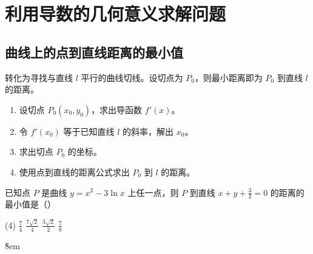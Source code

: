 \section{利用导数的几何意义求解问题}

\subsection{曲线上的点到直线距离的最小值}
\begin{theorem}[曲线到直线距离的最小值]
    转化为寻找与直线 $l$ 平行的曲线切线。设切点为 $P_0$，则最小距离即为 $P_0$ 到直线 $l$ 的距离。
    \begin{enumerate}
        \item 设切点 $P_0(x_0, y_0)$，求出导函数 $f'(x)$。
        \item 令 $f'(x_0)$ 等于已知直线 $l$ 的斜率，解出 $x_0$。
        \item 求出切点 $P_0$ 的坐标。
        \item 使用点到直线的距离公式求出 $P_0$ 到 $l$ 的距离。
    \end{enumerate}
\end{theorem}
\begin{example}
    已知点 $P$ 是曲线 $y = x^{2} - 3\ln x$ 上任一点，则 $P$ 到直线 $x + y + \frac{3}{2} = 0$ 的距离的最小值是（\quad）
    \begin{tasks}(4)
        \task $\frac{7}{4}$ \task $\frac{7\sqrt{2}}{4}$ \task $\frac{3\sqrt{2}}{2}$
        \task $\frac{7}{8}$
    \end{tasks}
\end{example}

\v{8em}
